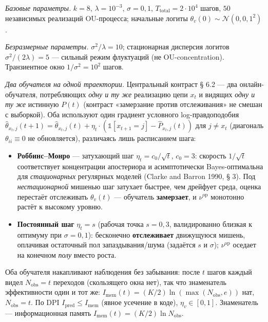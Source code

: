 \documentclass[pdflatex,sn-mathphys-ay]{sn-jnl}
\providecommand{\tightlist}{\setlength{\itemsep}{0pt}\setlength{\parskip}{0pt}}
\begin{document}
\emph{Базовые параметры.} \(k = 8\), \(\lambda = 10^{-3}\), \(\sigma = 0{,}1\), \(T_{\text{total}} = 2 \cdot 10^4\) шагов, \(50\) независимых реализаций OU-процесса; начальные логиты \(\theta_v(0) \sim \mathcal{N}(0, 0{,}1^2)\).



\emph{Безразмерные параметры.} \(\sigma^2/\lambda = 10\); стационарная дисперсия логитов \(\sigma^2/(2\lambda) = 5\) --- сильный режим флуктуаций (не OU-concentration). Транзиентное окно \(1/\sigma^2 = 10^2\) шагов.



\emph{Два обучателя на одной траектории.} Центральный контраст § 6.2 --- два онлайн-обучателя, потребляющих \emph{одну и ту же} реализацию цепи \(x_t\) и видящих \emph{одну и ту же} истинную \(P(t)\) (контраст «замерзание против отслеживания» не смешан с выборкой). Оба используют один градиент условного log-правдоподобия \(\hat\theta_{x_t, j}(t+1) = \hat\theta_{x_t, j}(t) + \eta_t \cdot (\mathbb{1}[x_{t+1} = j] - \hat P_{x_t, j}(t))\) для \(j \ne x_t\) (диагональ \(\theta_{ii} \equiv 0\) не обновляется), различаясь лишь расписанием шага:



\begin{itemize}

\tightlist

\item

  \textbf{Роббинс--Монро} --- затухающий шаг \(\eta_t = c_0 / \sqrt{t}\), \(c_0 = 3\): скорость \(1/\sqrt{t}\) соответствует концентрации апостериора и асимптотически Bayes-оптимальна для \emph{стационарных} регулярных моделей (Clarke and Barron 1990, § 3). Под \emph{нестационарной} мишенью шаг затухает быстрее, чем дрейфует среда, оценка перестаёт отслеживать \(\theta_v(t)\) --- обучатель \textbf{замерзает}, и \(\nu^{\text{op}}\) монотонно растёт к высокому уровню.

\item

  \textbf{Постоянный шаг} \(\eta_t = s\) (рабочая точка \(s = 0{,}3\), валидированно близкая к оптимуму при \(\sigma = 0{,}1\)): бесконечно \textbf{отслеживает} движущуюся мишень, оплачивая остаточный пол запаздывания/шума (задаётся \(s\) и \(\sigma\)); \(\nu^{\text{op}}\) оседает на конечном \emph{полу} вместо роста.

\end{itemize}



Оба обучателя накапливают наблюдения без забывания: после \(t\) шагов каждый видел \(N_{\text{obs}} = t\) переходов (скользящего окна нет), так что знаменатель эффективности один и тот же: \(I_{\text{mem}}(t) = (K/2)\ln(\max(N_{\text{obs}}, e))\) нат, \(N_{\text{obs}} = t\). По DPI \(I_{\text{pred}} \le I_{\text{mem}}\) (явное усечение в коде), \(\eta_v \in [0,1]\). Знаменатель --- информационная память \(I_{\text{mem}}(t) = (K/2)\ln N_{\text{obs}}\).
\end{document}
